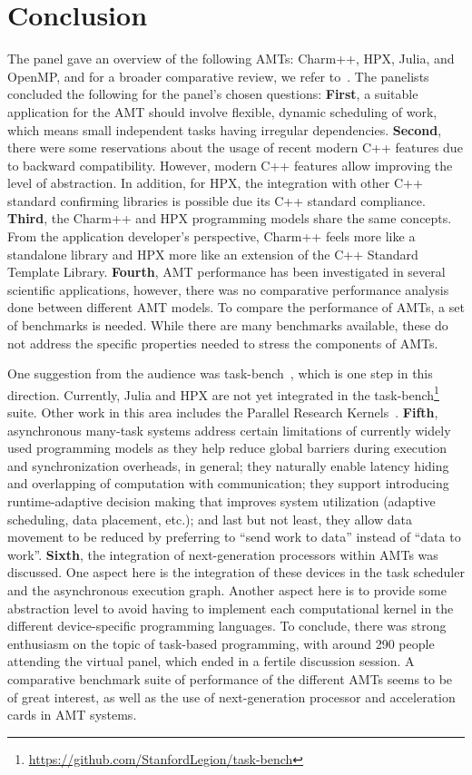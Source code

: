 \documentclass[12pt,letterpaper]{article}
\begin{document}
\section{Conclusion}
\label{sec:conclusion}
The panel gave an overview of the following AMTs: Charm++, HPX, Julia, and OpenMP, and for a broader comparative review, we refer to~\cite{thoman2018taxonomy,kulkarni2019comparative,hoque2018distributed}. The panelists concluded the following for the panel's chosen questions: 
%
\textbf{First}, a suitable application for the AMT should involve flexible, dynamic scheduling of work, which means small independent tasks having irregular dependencies. 
%
\textbf{Second}, there were some reservations about the usage of recent modern C++ features due to backward compatibility. However, modern C++ features allow improving the level of abstraction. In addition, for HPX, the integration with other C++ standard confirming libraries is possible due its C++ standard compliance. 
%
\textbf{Third}, the Charm++ and HPX programming models share the same concepts. From the application developer's perspective, Charm++ feels more like a standalone library and HPX more like an extension of the C++ Standard Template Library. 
%
\textbf{Fourth}, AMT performance has been investigated in several scientific applications, however, there was no comparative performance analysis done between different AMT models. To compare the performance of AMTs, a set of benchmarks is needed. While there are many benchmarks available, these do not address the specific properties needed to stress the components of AMTs. 

\newpage
\noindent
One suggestion from the audience was task-bench~\cite{slaughter2019task}, which is one step in this direction. Currently, Julia and HPX are not yet integrated in the task-bench\footnote{\url{https://github.com/StanfordLegion/task-bench}} suite. Other work in this area includes the Parallel Research Kernels~\cite{prkload}. 
%
\textbf{Fifth}, asynchronous many-task systems address certain limitations of currently widely used programming models as they help reduce global barriers during execution and synchronization overheads, in general; they naturally enable latency hiding and overlapping of computation with communication; they support introducing runtime-adaptive decision making that improves system utilization (adaptive scheduling, data placement, etc.); and last but not least, they allow data movement to be reduced by preferring to ``send work to data'' instead of ``data to work''.
%
\textbf{Sixth}, the integration of next-generation processors within AMTs was discussed. One aspect here is the integration of these devices in the task scheduler and the asynchronous execution graph. Another aspect here is to provide some abstraction level to avoid having to implement each computational kernel in the different device-specific programming languages.  
%
To conclude, there was strong enthusiasm on the topic of task-based programming, with around 290 people attending the virtual panel, which ended in a fertile discussion session. A comparative benchmark suite of performance of the different AMTs seems to be of great interest, as well as the use of next-generation processor and acceleration cards in AMT systems.  


\footnotesize
  

\end{document}
